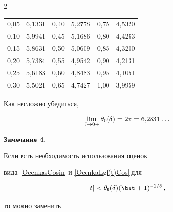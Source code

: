 \begin{multicols}{2}
\begin{center}
\begin{tabular}{|c|c||c|c||c|c|}

0,05 & 6,1331 & 0,40 & 5,2778  & 0,75 & 4,5320  \\


0,10 & 5,9941 & 0,45 & 5,1686 & 0,80 &  4,4263  \\


0,15 & 5,8631 & 0,50 & 5,0609  & 0,85 &  4,3200 \\


0,20 & 5,7384 & 0,55 & 4,9542  & 0,90 & 4,2131  \\


0,25 & 5,6183 & 0,60 & 4,8483  & 0,95 &  4,1051 \\


0,30 & 5,5021 & 0,65 &  4,7427  & 1,00 & 3,9959  \\

\hline

\end{tabular}

\end{center}






\bigskip

\addtocounter{table}{1}









Как несложно убедиться,

$$

\lim_{\d\to0+}\theta_0(\d)=2\pi=6{,}2831\ldots

$$



\medskip



\noindent

\textbf{Замечание 4.}

Если есть необходимость использования оценок

вида~\eqref{OcenkasCosin} и \eqref{OcenkaLgf(t)Cos} для

$$|t|<\theta_0(\d)(\bet+1)^{-1/\d}\,,$$

 то можно заменить


\end{multicols}
